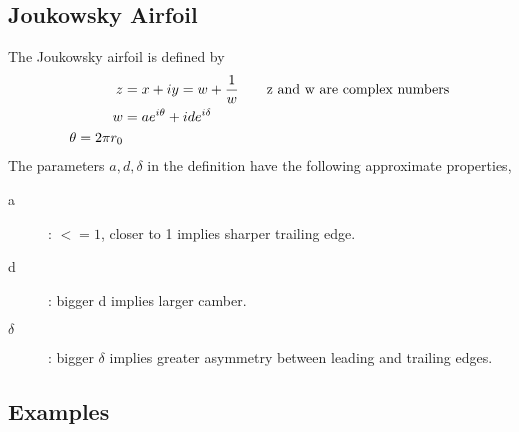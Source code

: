 \subsection{Joukowsky Airfoil}

    The Joukowsky airfoil is defined by
\begin{align*}
   z &= x + i y = w + {1\over w} \qquad\mbox{z and w are complex numbers}\\
   w &= a e^{i\theta} + i d e^{i\delta} \\
   \theta = 2\pi r_0
\end{align*}
The parameters $a,d,\delta$ in the definition have the following approximate properties,
\begin{description}
  \item[a] : $<=1$, closer to 1 implies sharper trailing edge.
  \item[d] : bigger d implies larger camber.
  \item[$\delta$] : bigger $\delta$ implies greater asymmetry between leading and trailing edges.
\end{description}
 


\subsection{Examples}

